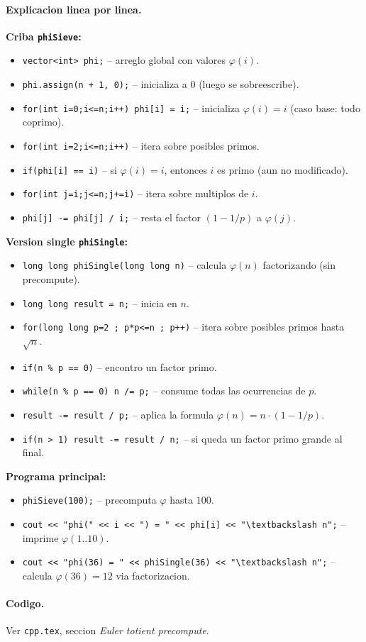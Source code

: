 \paragraph{Explicacion linea por linea.}
\textbf{Criba \texttt{phiSieve}:}
\begin{itemize}\setlength\itemsep{0pt}
	\item \verb|vector<int> phi;| -- arreglo global con valores $\varphi(i)$.
	\item \verb|phi.assign(n + 1, 0);| -- inicializa a $0$ (luego se sobreescribe).
	\item \verb|for(int i=0;i<=n;i++) phi[i] = i;| -- inicializa $\varphi(i) = i$ (caso base: todo coprimo).
	\item \verb|for(int i=2;i<=n;i++)| -- itera sobre posibles primos.
	\item \verb|if(phi[i] == i)| -- si $\varphi(i) = i$, entonces $i$ es primo (aun no modificado).
	\item \verb|for(int j=i;j<=n;j+=i)| -- itera sobre multiplos de $i$.
	\item \verb|phi[j] -= phi[j] / i;| -- resta el factor $(1 - 1/p)$ a $\varphi(j)$.
\end{itemize}
\textbf{Version single \texttt{phiSingle}:}
\begin{itemize}\setlength\itemsep{0pt}
	\item \verb|long long phiSingle(long long n)| -- calcula $\varphi(n)$ factorizando (sin precompute).
	\item \verb|long long result = n;| -- inicia en $n$.
	\item \verb|for(long long p=2 ; p*p<=n ; p++)| -- itera sobre posibles primos hasta $\sqrt{n}$.
	\item \verb|if(n % p == 0)| -- encontro un factor primo.
	\item \verb|while(n % p == 0) n /= p;| -- consume todas las ocurrencias de $p$.
	\item \verb|result -= result / p;| -- aplica la formula $\varphi(n) = n \cdot (1 - 1/p)$.
	\item \verb|if(n > 1) result -= result / n;| -- si queda un factor primo grande al final.
\end{itemize}
\textbf{Programa principal:}
\begin{itemize}\setlength\itemsep{0pt}
	\item \verb|phiSieve(100);| -- precomputa $\varphi$ hasta $100$.
	\item \verb|cout << "phi(" << i << ") = " << phi[i] << "\textbackslash n";| -- imprime $\varphi(1..10)$.
	\item \verb|cout << "phi(36) = " << phiSingle(36) << "\textbackslash n";| -- calcula $\varphi(36)=12$ via factorizacion.
\end{itemize}

\paragraph{Codigo.}
Ver \texttt{cpp.tex}, seccion \textit{Euler totient precompute}.

\vspace{0.5em|||}
